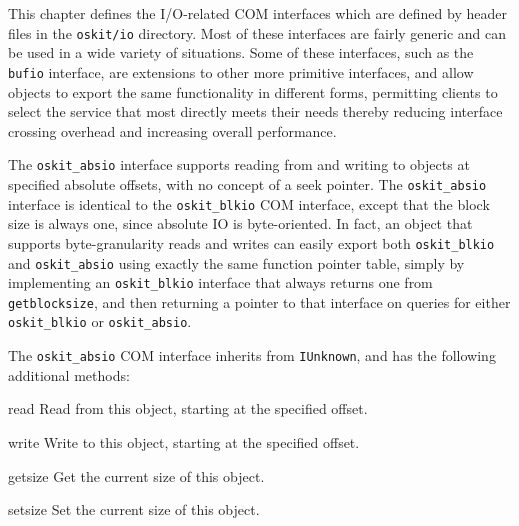 %
% 
%
\label{oskit-io}

This chapter defines the I/O-related COM interfaces
which are defined by header files in the \texttt{oskit/io} directory.
Most of these interfaces are fairly generic
and can be used in a wide variety of situations.
Some of these interfaces, such as the \texttt{bufio} interface,
are extensions to other more primitive interfaces,
and allow objects to export the same functionality in different forms,
permitting clients to select the service that most directly meets their needs
thereby reducing interface crossing overhead
and increasing overall performance.


\label{oskit-absio}

	The {\tt oskit_absio} interface supports reading from and writing to
objects at specified absolute offsets, with no concept of a seek
pointer.  The {\tt oskit_absio} interface is identical to the
{\tt oskit_blkio} COM interface, except that the block size is always one,
since absolute IO is byte-oriented.
In fact, an object that supports byte-granularity reads and writes
can easily export both {\tt oskit_blkio} and {\tt oskit_absio}
using exactly the same function pointer table,
simply by implementing an {\tt oskit_blkio} interface
that always returns one from \texttt{getblocksize},
and then returning a pointer to that interface
on queries for either {\tt oskit_blkio} or {\tt oskit_absio}.

	The {\tt oskit_absio} COM interface inherits from {\tt IUnknown},
and has the following additional methods:	
\begin{csymlist}
\item[read]
	Read from this object, starting at the specified offset.
\item[write]
	Write to this object, starting at the specified offset.
\item[getsize]
	Get the current size of this object.
\item[setsize]
	Set the current size of this object.
\end{csymlist}

